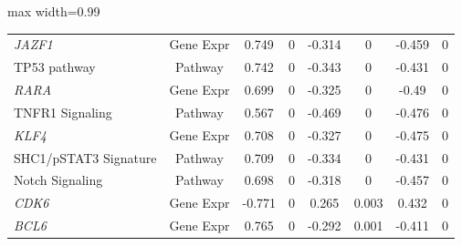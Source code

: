 \documentclass[sigconf,authordraft]{acmart}
\begin{document}
\begin{table}[!ht]
\begin{adjustbox}{max width=0.99\linewidth}
\begin{tabular}{|l|c|c|c|c|c|c|c|}
        \textit{JAZF1} & Gene Expr & 0.749 & 0 & -0.314 & 0 & -0.459 & 0 \\
        TP53 pathway & Pathway & 0.742 & 0 & -0.343 & 0 & -0.431 & 0 \\
        \textit{RARA}  & Gene Expr & 0.699 & 0 & -0.325 & 0 & -0.49 & 0 \\
        TNFR1 Signaling & Pathway & 0.567 & 0 & -0.469 & 0 & -0.476 & 0 \\
        \textit{KLF4}  & Gene Expr & 0.708 & 0 & -0.327 & 0 & -0.475 & 0 \\
        SHC1/pSTAT3 Signature & Pathway & 0.709 & 0 & -0.334 & 0 & -0.431 & 0 \\
        Notch Signaling & Pathway & 0.698 & 0 & -0.318 & 0 & -0.457 & 0 \\
        \textit{CDK6} & Gene Expr & -0.771 & 0 & 0.265 & 0.003 & 0.432 & 0 \\
        \textit{BCL6} & Gene Expr & 0.765 & 0 & -0.292 & 0.001 & -0.411 & 0 \\ \hline
    \end{tabular}
    \end{adjustbox}
\end{table}

\end{document}
